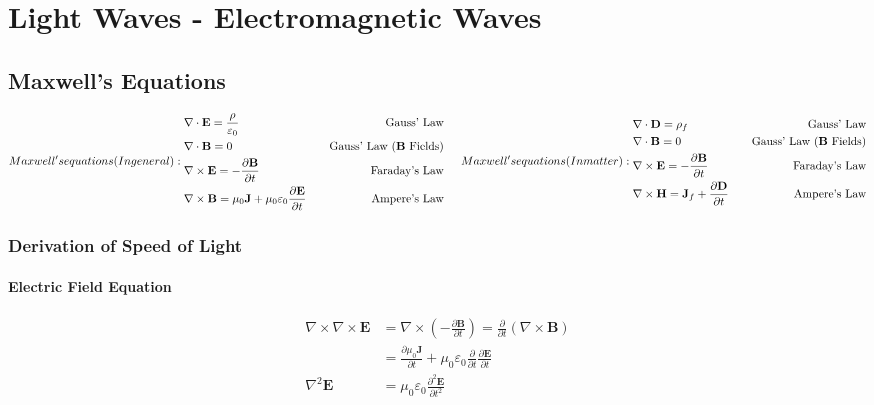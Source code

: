 \documentclass[UTF8]{book}
\begin{document}
\chapter{Light Waves - Electromagnetic Waves}


\section{Maxwell's Equations}
\begin{subequations}
Maxwell's equations (In general):
\begin{align}
	&\nabla \cdot \mathbf{E}=\frac{\rho}{\varepsilon_0}\quad &\textrm{Gauss' Law} \\
            &\nabla \cdot \mathbf{B}= 0\quad &\textrm{Gauss' Law ($\mathbf{B}$ Fields)}\\
          &\nabla \times \mathbf{E}=-\frac{\partial \mathbf{B}}{\partial t}\quad &\textrm{Faraday's Law}\\
          &\nabla \times \mathbf{B}=\mu_0 \mathbf{J} + \mu_0\varepsilon_0\frac{\partial \mathbf{E}}{\partial t}\quad &\textrm{Ampere's Law} 
\end{align}

\indent Maxwell's equations (In matter):
\begin{align}
	&\nabla \cdot \mathbf{D}=\rho _f\quad &\textrm{Gauss' Law} \\
            &\nabla \cdot \mathbf{B}= 0\quad &\textrm{Gauss' Law ($\mathbf{B}$ Fields)}\\
          &\nabla \times \mathbf{E}=-\frac{\partial \mathbf{B}}{\partial t}\quad &\textrm{Faraday's Law}\\
          &\nabla \times \mathbf{H}=\mathbf{J}_f+\frac{\partial \mathbf{D}}{\partial t}\quad &\textrm{Ampere's Law} 
\end{align}
\end{subequations}


\subsection{Derivation of Speed of Light}


\subsubsection{Electric Field Equation}
\begin{align*}
\nabla \times \nabla \times \mathbf{E}&=\nabla \times \left(-\frac{\partial \mathbf{B}}{\partial t}\right)=\frac{\partial }{\partial t}\left(\nabla \times \mathbf{B}\right)\\
&=\frac{\partial \mu_0 \mathbf{J}}{\partial t}+\mu_0 \varepsilon_0\frac{\partial }{\partial t}\frac{\partial \mathbf{E}}{\partial t}\\
\nabla ^2\mathbf{E}&=\mu_0 \varepsilon_0\frac{\partial ^2 \mathbf{E}}{\partial t^2}
\end{align*}
\end{document}
